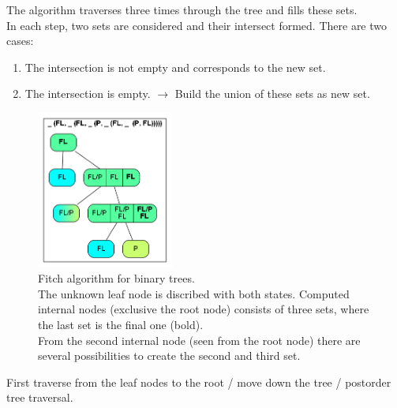       The algorithm traverses three times through the tree and fills these sets. \\
      In each step, two sets are considered and their intersect formed. There are two cases:
      \begin{enumerate}
        \item The intersection is not empty and corresponds to the new set.
        \item The intersection is empty. $\rightarrow$ Build the union of these sets as new set.
      \end{enumerate}
      \begin{figure}
        \centering
        \includegraphics[width=0.4\textwidth]{Figures/Fitch1.png}
        \caption{Fitch algorithm for binary trees. \\
          The unknown leaf node is discribed with both states. Computed internal nodes (exclusive the 
          root node) consists of three sets, where the last set is the final one (bold). \\
          From the second internal node (seen from the root node) there are several possibilities to 
          create the second and third set.}
        \label{fig: binary Fitch}
      \end{figure}
      First traverse from the leaf nodes to the root / move down the tree / postorder tree traversal.
      
